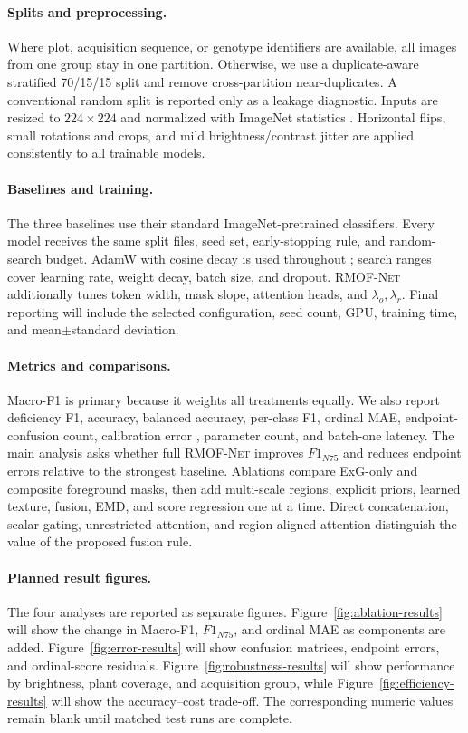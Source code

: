 \documentclass[conference]{IEEEtran}
\newcommand{\rmofnet}{\textsc{RMOF-Net}\xspace}
\begin{document}
\paragraph{Splits and preprocessing.}
Where plot, acquisition sequence, or genotype identifiers are available, all images from one group stay in one partition. Otherwise, we use a duplicate-aware stratified 70/15/15 split and remove cross-partition near-duplicates. A conventional random split is reported only as a leakage diagnostic. Inputs are resized to $224\times224$ and normalized with ImageNet statistics \cite{deng2009imagenet}. Horizontal flips, small rotations and crops, and mild brightness/contrast jitter are applied consistently to all trainable models.

\paragraph{Baselines and training.}
The three baselines use their standard ImageNet-pretrained classifiers. Every model receives the same split files, seed set, early-stopping rule, and random-search budget. AdamW with cosine decay is used throughout \cite{loshchilov2019adamw}; search ranges cover learning rate, weight decay, batch size, and dropout. \rmofnet additionally tunes token width, mask slope, attention heads, and $\lambda_o,\lambda_r$. Final reporting will include the selected configuration, seed count, GPU, training time, and mean$\pm$standard deviation.

\paragraph{Metrics and comparisons.}
Macro-F1 is primary because it weights all treatments equally. We also report deficiency F1, accuracy, balanced accuracy, per-class F1, ordinal MAE, endpoint-confusion count, calibration error \cite{guo2017calibration}, parameter count, and batch-one latency. The main analysis asks whether full \rmofnet improves $F1_{N75}$ and reduces endpoint errors relative to the strongest baseline. Ablations compare ExG-only and composite foreground masks, then add multi-scale regions, explicit priors, learned texture, fusion, EMD, and score regression one at a time. Direct concatenation, scalar gating, unrestricted attention, and region-aligned attention distinguish the value of the proposed fusion rule.

\paragraph{Planned result figures.}
The four analyses are reported as separate figures. Figure~\ref{fig:ablation-results} will show the change in Macro-F1, $F1_{N75}$, and ordinal MAE as components are added. Figure~\ref{fig:error-results} will show confusion matrices, endpoint errors, and ordinal-score residuals. Figure~\ref{fig:robustness-results} will show performance by brightness, plant coverage, and acquisition group, while Figure~\ref{fig:efficiency-results} will show the accuracy--cost trade-off. The corresponding numeric values remain blank until matched test runs are complete.
\end{document}

